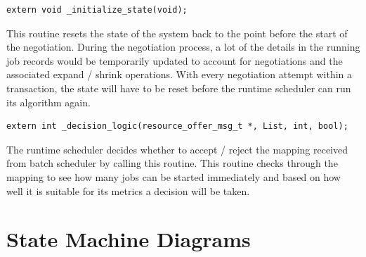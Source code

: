 \begin{lstlisting}[mathescape,frame=single]
extern void _initialize_state(void);
\end{lstlisting}
This routine resets the state of the system back to the point before the start of the negotiation. During the negotiation process, a lot of the details in the running job records would be temporarily updated to account for negotiations and the associated expand / shrink operations. With every negotiation attempt within a transaction, the state will have to be reset before the runtime scheduler can run its algorithm again.\\
\begin{lstlisting}[mathescape,frame=single]
extern int _decision_logic(resource_offer_msg_t *, List, int, bool);
\end{lstlisting}
The runtime scheduler decides whether to accept / reject the mapping received from batch scheduler by calling this routine. This routine checks through the mapping to see how many jobs can be started immediately and based on how well it is suitable for its metrics a decision will be taken.
\section{State Machine Diagrams}
